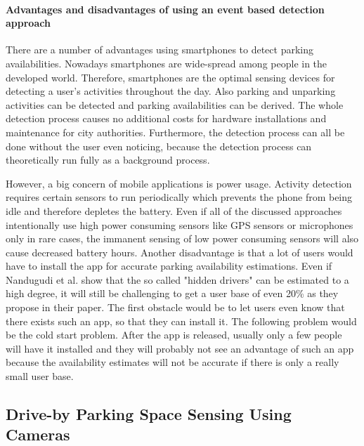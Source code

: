 \paragraph{Advantages and disadvantages of using an event based detection approach}

There are a number of advantages using smartphones to detect parking availabilities. Nowadays smartphones are wide-spread among people in the developed world. Therefore, smartphones are the optimal sensing devices for detecting a user's activities throughout the day. Also parking and unparking activities can be detected and parking availabilities can be derived. The whole detection process causes no additional costs for hardware installations and maintenance for city authorities. Furthermore, the detection process can all be done without the user even noticing, because the detection process can theoretically run fully as a background process.

However, a big concern of mobile applications is power usage. Activity detection requires certain sensors to run periodically which prevents the phone from being idle and therefore depletes the battery. Even if all of the discussed approaches intentionally use high power consuming sensors like GPS sensors or microphones only in rare cases, the immanent sensing of low power consuming sensors will also cause decreased battery hours. Another disadvantage is that a lot of users would have to install the app for accurate parking availability estimations. Even if Nandugudi et al. \cite{Nandugudi:2014:PPP:2632048.2632098} show that the so called "hidden drivers" can be estimated to a high degree, it will still be challenging to get a user base of even 20\% as they propose in their paper. The first obstacle would be to let users even know that there exists such an app, so that they can install it. The following problem would be the cold start problem. After the app is released, usually only a few people will have it installed and they will probably not see an advantage of such an app because the availability estimates will not be accurate if there is only a really small user base.







\subsection{Drive-by Parking Space Sensing Using Cameras}
\label{sec:related_driveby_park_sensing_cameras}

